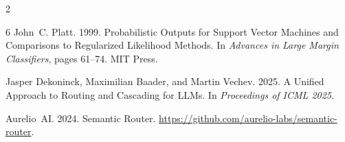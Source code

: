 \documentclass[11pt,a4paper]{article}
\begin{document}
\begin{multicols}{2}
\begin{thebibliography}{6}
John~C. Platt. 1999.
\newblock Probabilistic Outputs for Support Vector Machines and Comparisons to Regularized Likelihood Methods.
\newblock In \emph{Advances in Large Margin Classifiers}, pages 61--74. MIT Press.

Jasper Dekoninck, Maximilian Baader, and Martin Vechev. 2025.
\newblock A Unified Approach to Routing and Cascading for {LLMs}.
\newblock In \emph{Proceedings of ICML 2025}.

Aurelio~AI. 2024.
\newblock Semantic Router.
\newblock \url{https://github.com/aurelio-labs/semantic-router}.
\end{thebibliography}

\end{multicols}
\end{document}
